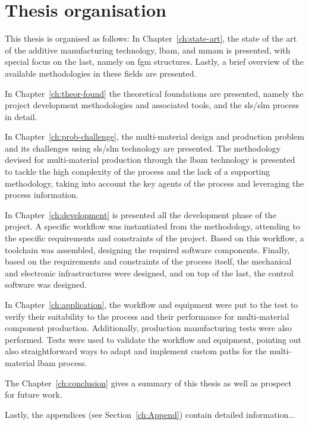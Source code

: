 %
\section{Thesis organisation}
This thesis is organised as follows:
In Chapter~\ref{ch:state-art}, the state of the art of the additive
manufacturing technology, \gls{lbam}, and \gls{mmam} is presented, with special
focus on the last, namely on \gls{fgm} structures. Lastly, a brief overview of
the available methodologies in these fields are presented.

In Chapter~\ref{ch:theor-found} the theoretical foundations are presented, namely the project development methodologies and associated tools,
and the \gls{sls}/\gls{slm} process in detail.

In Chapter~\ref{ch:prob-challenge}, the multi-material design and production
problem and its challenges using \gls{sls}/\gls{slm} technology are
presented. The methodology devised for multi-material production through the
\gls{lbam} technology is presented to tackle the high complexity of the process
and the lack of a supporting methodology, taking into account the key agents of
the process and leveraging the process information.

In Chapter~\ref{ch:development} is presented all the development phase of the
project. A specific workflow was instantiated from
the methodology, attending to the specific requirements and constraints of the
project. Based on this workflow, a toolchain was assembled, designing the
required software components. Finally, based on the requirements and constraints
of the process itself, the mechanical and electronic infrastructures were
designed, and on top of the last, the control software was designed.

In Chapter~\ref{ch:application}, the workflow and equipment were put to the test
to verify their suitability to the process and their performance for
multi-material component production. Additionally, production manufacturing tests
were also performed. Tests were used to validate the workflow and equipment,
pointing out also straightforward ways to adapt and implement custom paths for
the multi-material \gls{lbam} process.

The Chapter~\ref{ch:conclusion} gives a summary of this thesis as well as
prospect for future work.

Lastly, the appendices (see Section~\ref{ch:Append}) contain detailed information...
